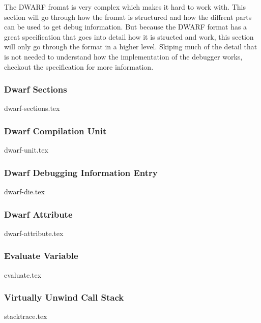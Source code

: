  


The \gls{DWARF} fromat is very complex which makes it hard to work with.
This section will go through how the fromat is structured and how the diffrent parts can be used to get debug information.
But because the \gls{DWARF} format has a great specification that goes into detail how it is structed and work, this section will only go through the format in a higher level.
Skiping much of the detail that is not needed to understand how the implementation of the debugger works, checkout the specification \cite{dwarf} for more information.


\subsubsection{Dwarf Sections}
{dwarf-sections.tex}


\subsubsection{Dwarf Compilation Unit}
{dwarf-unit.tex}


\subsubsection{Dwarf Debugging Information Entry}
{dwarf-die.tex}


\subsubsection{Dwarf Attribute}
{dwarf-attribute.tex}


\subsubsection{Evaluate Variable}
\label{sec:evaluate-variable}
{evaluate.tex}


\subsubsection{Virtually Unwind Call Stack}
{stacktrace.tex}

